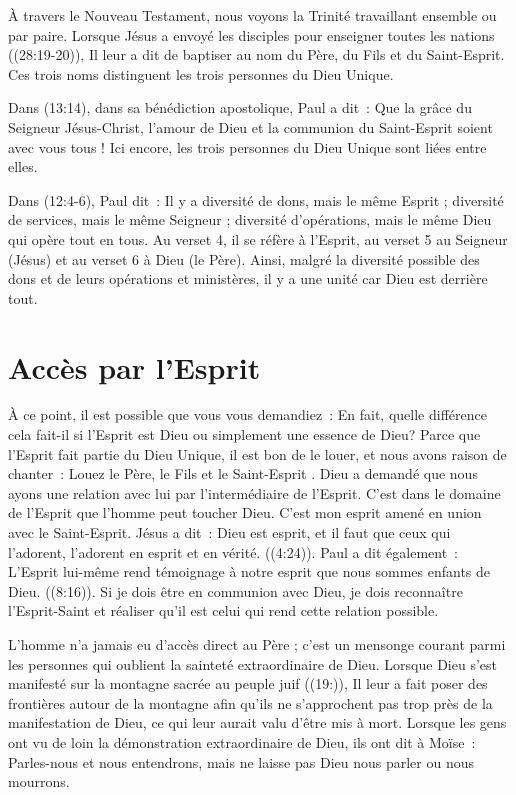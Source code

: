À travers le Nouveau Testament, nous voyons la Trinité travaillant ensemble ou par paire. Lorsque Jésus a envoyé les disciples pour enseigner toutes les nations ((28:19-20)), Il leur a dit de baptiser au nom du Père, du Fils et du Saint-Esprit. Ces trois noms distinguent les trois personnes du Dieu Unique.

Dans (13:14), dans sa bénédiction apostolique, Paul a dit~: \og Que la grâce du Seigneur Jésus-Christ, l'amour de Dieu et la communion du Saint-Esprit soient avec vous tous ! \fg{} Ici encore, les trois personnes du Dieu Unique sont liées entre elles.

Dans (12:4-6), Paul dit~: \og Il y a diversité de dons, mais le même Esprit ; diversité de services, mais le même Seigneur ; diversité d'opérations, mais le même Dieu qui opère tout en tous. \fg{} Au verset 4, il se réfère à l'Esprit, au verset 5 au Seigneur (Jésus) et au verset 6 à Dieu (le Père). Ainsi, malgré la diversité possible des dons et de leurs opérations et ministères, il y a une unité car Dieu est derrière tout.


\section*{Accès par l'Esprit}

À ce point, il est possible que vous vous demandiez~: \og En fait, quelle différence cela fait-il si l'Esprit est Dieu ou simplement une essence de Dieu? \fg{} Parce que l'Esprit fait partie du Dieu Unique, il est bon de le louer, et nous avons raison de chanter~: \og Louez le Père, le Fils et le Saint-Esprit \fg{}. Dieu a demandé que nous ayons une relation avec lui par l'intermédiaire de l'Esprit. C'est dans le domaine de l'Esprit que l'homme peut toucher Dieu. C'est mon esprit amené en union avec le Saint-Esprit. Jésus a dit~: \og Dieu est esprit, et il faut que ceux qui l'adorent, l'adorent en esprit et en vérité. \fg{} ((4:24)). Paul a dit également~: \og L'Esprit lui-même rend témoignage à notre esprit que nous sommes enfants de Dieu.  \fg{} ((8:16)). Si je dois être en communion avec Dieu, je dois reconnaître l'Esprit-Saint et réaliser qu'il est celui qui rend cette relation possible.

L'homme n'a jamais eu d'accès direct au Père ; c'est un mensonge courant parmi les personnes qui oublient la sainteté extraordinaire de Dieu. Lorsque Dieu s'est manifesté sur la montagne sacrée au peuple juif ((19:)), Il leur a fait poser des frontières autour de la montagne afin qu'ils ne s'approchent pas trop près de la manifestation de Dieu, ce qui leur aurait valu d'être mis à mort. Lorsque les gens ont vu de loin la démonstration extraordinaire de Dieu, ils ont dit à Moïse~: \og Parles-nous et nous entendrons, mais ne laisse pas Dieu nous parler ou nous mourrons. \fg{}

